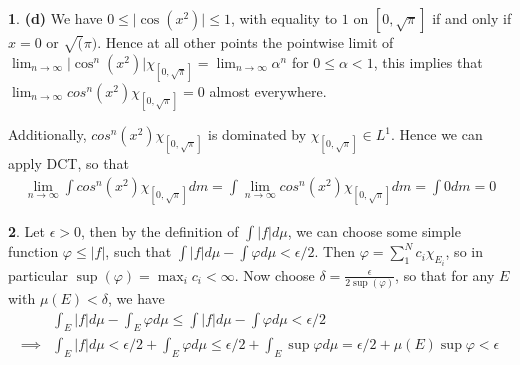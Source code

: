 \documentclass[10.5pt]{article}
\theoremstyle{definition}
\newtheorem{pb}{}
\newcommand{\abs}[1]{\lvert#1\rvert}
\newcommand{\tor}{\text{ or }}
\begin{document}
\begin{pb}
    \textbf{(d)} We have \(0 \leq \abs{\cos(x^2)} \leq 1\), with equality to \(1\) on \([0,\sqrt{\pi}]\) if and only if \(x = 0 \tor \sqrt(\pi)\).
    Hence at all other points the pointwise limit of 
    \(\lim_{n\to\infty}\abs{\cos^n(x^2)}\chi_{[0,\sqrt{\pi}]} = \lim_{n\to\infty}\alpha^n\) for \(0 \leq \alpha < 1\),
    this implies that \(\lim_{n\to\infty}cos^n(x^2)\chi_{[0,\sqrt{\pi}]} = 0\) almost everywhere.

    Additionally, \(cos^{n}(x^2)\chi_{[0,\sqrt{\pi}]}\) is dominated by \(\chi_{[0,\sqrt{\pi}]} \in L^1\). Hence we can apply DCT, so that
    \begin{align*}
        \lim_{n\to\infty} \int cos^n(x^2)\chi_{[0,\sqrt{\pi}]} dm = \int \lim_{n\to\infty} cos^n(x^2)\chi_{[0,\sqrt{\pi}]} dm
        = \int 0 dm = 0
    \end{align*}
\end{pb}
\begin{pb}
    Let \(\epsilon > 0\), then by the definition of \(\int \abs{f}d\mu\), we can choose some simple function \(\varphi \leq \abs{f}\), such that \(\int \abs{f}d\mu - \int \varphi d\mu < \epsilon/2\).
    Then \(\varphi = \sum_1^N c_i \chi_{E_i}\), so in particular \(\sup(\varphi) = \max_ic_i < \infty\). Now choose \(\delta = \frac{\epsilon}{2\sup(\varphi)}\), so that for any \(E\) with
    \(\mu(E) < \delta\), we have
    \begin{align*}
        &\int_E \abs{f}d\mu - \int_E \varphi d\mu \leq \int \abs{f}d\mu - \int \varphi d\mu < \epsilon/2 \\
        \implies &\int_E \abs{f}d\mu < \epsilon/2 + \int_E \varphi d\mu \leq \epsilon/2 + \int_E \sup \varphi d\mu 
        = \epsilon/2 + \mu(E) \sup \varphi < \epsilon
    \end{align*}
\end{pb}
\end{document}
